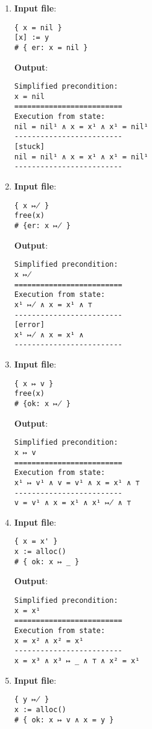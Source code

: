 \documentclass[parskip=half]{scrartcl}
\begin{document}
\begin{enumerate}
\item 
\textbf{Input file}: 
\begin{verbatim}
{ x = nil }
[x] := y
# { er: x = nil }
\end{verbatim}

\textbf{Output}: 
\begin{verbatim}
Simplified precondition:
x = nil
=========================
Execution from state:
nil = nil¹ ∧ x = x¹ ∧ x¹ = nil¹
-------------------------
[stuck]
nil = nil¹ ∧ x = x¹ ∧ x¹ = nil¹
-------------------------
\end{verbatim}

\item 
\textbf{Input file}: 
\begin{verbatim}
{ x ↦̸ }
free(x)
# {er: x ↦̸ }
\end{verbatim}

\textbf{Output}: 
\begin{verbatim}
Simplified precondition:
x ↦̸
=========================
Execution from state:
x¹ ↦̸ ∧ x = x¹ ∧ ⊤
-------------------------
[error]
x¹ ↦̸ ∧ x = x¹ ∧ 
-------------------------
\end{verbatim}

\item 
\textbf{Input file}: 
\begin{verbatim}
{ x ↦ v }
free(x)
# {ok: x ↦̸ }
\end{verbatim}

\textbf{Output}: 
\begin{verbatim}
Simplified precondition:
x ↦ v
=========================
Execution from state:
x¹ ↦ v¹ ∧ v = v¹ ∧ x = x¹ ∧ ⊤
-------------------------
v = v¹ ∧ x = x¹ ∧ x¹ ↦̸ ∧ ⊤
\end{verbatim}

\item 
\textbf{Input file}: 
\begin{verbatim}
{ x = x' }
x := alloc()
# { ok: x ↦ _ }
\end{verbatim}

\textbf{Output}: 
\begin{verbatim}
Simplified precondition:
x = x¹
=========================
Execution from state:
x = x² ∧ x² = x¹
-------------------------
x = x³ ∧ x³ ↦ _ ∧ ⊤ ∧ x² = x¹
\end{verbatim}

\item 
\textbf{Input file}: 
\begin{verbatim}
{ y ↦̸ }
x := alloc()
# { ok: x ↦ v ∧ x = y }
\end{verbatim}


\end{enumerate}
\end{document}
